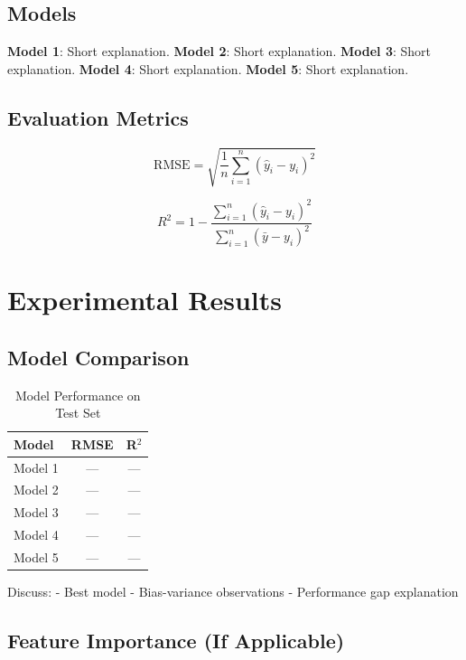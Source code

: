 \documentclass[conference]{IEEEtran}
\begin{document}
\subsection{Models}

\textbf{Model 1}: Short explanation.  
\textbf{Model 2}: Short explanation.  
\textbf{Model 3}: Short explanation.  
\textbf{Model 4}: Short explanation.  
\textbf{Model 5}: Short explanation.  

\subsection{Evaluation Metrics}

\begin{equation}
\text{RMSE} = \sqrt{\frac{1}{n}\sum_{i=1}^{n}(\hat{y}_i - y_i)^2}
\end{equation}

\begin{equation}
R^2 = 1 - \frac{\sum_{i=1}^{n}(\hat{y}_i - y_i)^2}{\sum_{i=1}^{n}(\bar{y} - y_i)^2}
\end{equation}

\section{Experimental Results}
\label{sec:results}

\subsection{Model Comparison}

\begin{table}[h]
\centering
\caption{Model Performance on Test Set}
\label{tab:results}
\begin{tabular}{lcc}
\toprule
Model & RMSE & R$^2$ \\
\midrule
Model 1 & --- & --- \\
Model 2 & --- & --- \\
Model 3 & --- & --- \\
Model 4 & --- & --- \\
Model 5 & --- & --- \\
\bottomrule
\end{tabular}
\end{table}

Discuss:
- Best model
- Bias-variance observations
- Performance gap explanation

\subsection{Feature Importance (If Applicable)}
\end{document}
